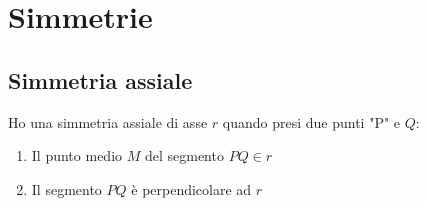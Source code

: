 
\chapter{Simmetrie}
\section{Simmetria assiale}
Ho una simmetria assiale di asse $r$ quando presi due punti "P" e $Q$:
\begin{enumerate}
	\item Il punto medio $M$ del segmento $PQ\in r$
	\item Il segmento $PQ$ è perpendicolare ad $r$
\end{enumerate} 